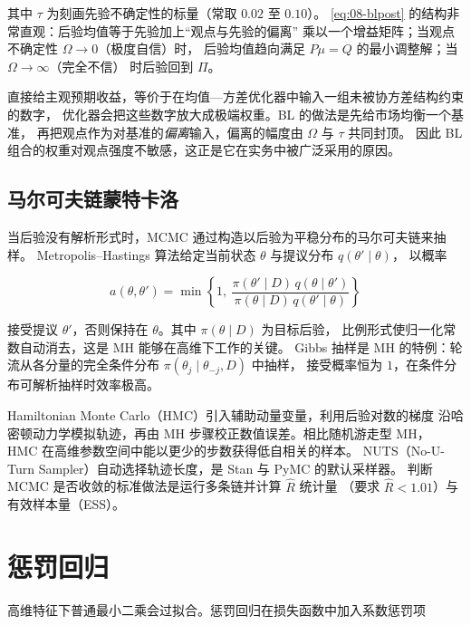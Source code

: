 其中 $\tau$ 为刻画先验不确定性的标量（常取 $0.02$ 至 $0.10$）。
\cref{eq:08-blpost} 的结构非常直观：后验均值等于先验加上“观点与先验的偏离”
乘以一个增益矩阵；当观点不确定性 $\Omega \to 0$（极度自信）时，
后验均值趋向满足 $P\mu = Q$ 的最小调整解；当 $\Omega \to \infty$（完全不信）
时后验回到 $\Pi$。

\begin{intuitionbox}
直接给主观预期收益，等价于在均值—方差优化器中输入一组未被协方差结构约束的数字，
优化器会把这些数字放大成极端权重。BL 的做法是先给市场均衡一个基准，
再把观点作为对基准的\emph{偏离}输入，偏离的幅度由 $\Omega$ 与 $\tau$ 共同封顶。
因此 BL 组合的权重对观点强度不敏感，这正是它在实务中被广泛采用的原因。
\end{intuitionbox}

\subsection{马尔可夫链蒙特卡洛}

当后验没有解析形式时，MCMC 通过构造以后验为平稳分布的马尔可夫链来抽样。
Metropolis--Hastings 算法给定当前状态 $\theta$ 与提议分布 $q(\theta' \mid \theta)$，
以概率

\begin{equation}
  a(\theta,\theta') = \min\left\{1,\
  \frac{\pi(\theta' \mid D)\,q(\theta \mid \theta')}{\pi(\theta \mid D)\,q(\theta' \mid \theta)}\right\}
  \label{eq:08-mh}
\end{equation}

接受提议 $\theta'$，否则保持在 $\theta$。其中 $\pi(\theta\mid D)$ 为目标后验，
比例形式使归一化常数自动消去，这是 MH 能够在高维下工作的关键。
Gibbs 抽样是 MH 的特例：轮流从各分量的完全条件分布 $\pi(\theta_j \mid \theta_{-j}, D)$ 中抽样，
接受概率恒为 $1$，在条件分布可解析抽样时效率极高。

Hamiltonian Monte Carlo（HMC）引入辅助动量变量，利用后验对数的梯度
沿哈密顿动力学模拟轨迹，再由 MH 步骤校正数值误差。相比随机游走型 MH，
HMC 在高维参数空间中能以更少的步数获得低自相关的样本。
NUTS（No-U-Turn Sampler）自动选择轨迹长度，是 Stan 与 PyMC 的默认采样器。
判断 MCMC 是否收敛的标准做法是运行多条链并计算 $\hat{R}$ 统计量
（要求 $\hat{R} < 1.01$）与有效样本量（ESS）。

\section{惩罚回归}

高维特征下普通最小二乘会过拟合。惩罚回归在损失函数中加入系数惩罚项


